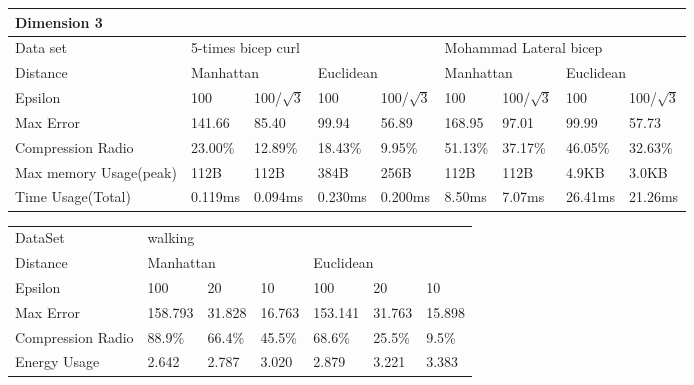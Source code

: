 \documentclass[10pt, conference, compsocconf]{IEEEtran}
\begin{document}
\begin{table*}[]
    \begin{tabular}{|l|l|l|l|l|l|l|l|l|}
    \hline
    \multicolumn{9}{|l|}{Dimension 3}                                                                                                                         \\ \hline
    Data set               & \multicolumn{4}{l|}{5-times bicep curl}                        & \multicolumn{4}{l|}{Mohammad Lateral bicep}                     \\ \hline
    Distance               & \multicolumn{2}{l|}{Manhattan} & \multicolumn{2}{l|}{Euclidean} & \multicolumn{2}{l|}{Manhattan} & \multicolumn{2}{l|}{Euclidean} \\ \hline
    Epsilon                & 100          & 100/$\sqrt{3}$  & 100         & 100/$\sqrt{3}$  & 100        & 100/$\sqrt{3}$    & 100        & 100/$\sqrt{3}$    \\ \hline
    Max Error              & 141.66       & 85.40           & 99.94       & 56.89           & 168.95     & 97.01             & 99.99      & 57.73             \\ \hline
    Compression Radio      & 23.00\%      & 12.89\%         & 18.43\%     & 9.95\%          & 51.13\%    & 37.17\%           & 46.05\%    & 32.63\%           \\ \hline
    Max memory Usage(peak) & 112B         & 112B            & 384B        & 256B            & 112B       & 112B              & 4.9KB      & 3.0KB             \\ \hline
    Time Usage(Total)      & 0.119ms      & 0.094ms         & 0.230ms     & 0.200ms         & 8.50ms     & 7.07ms            & 26.41ms    & 21.26ms           \\ \hline
    \end{tabular}
\end{table*}


\begin{table}[]
\begin{tabular}{lllllll}
DataSet           & \multicolumn{6}{l}{walking}                                   \\
Distance          & \multicolumn{3}{l}{Manhattan} & \multicolumn{3}{l}{Euclidean} \\
Epsilon           & 100       & 20      & 10      & 100       & 20      & 10      \\
Max Error         & 158.793   & 31.828  & 16.763  & 153.141   & 31.763  & 15.898  \\
Compression Radio & 88.9\%    & 66.4\%  & 45.5\%  & 68.6\%    & 25.5\%  & 9.5\%   \\
Energy Usage      & 2.642     & 2.787   & 3.020   & 2.879     & 3.221   & 3.383
\end{tabular}
\end{table}
\end{document}
